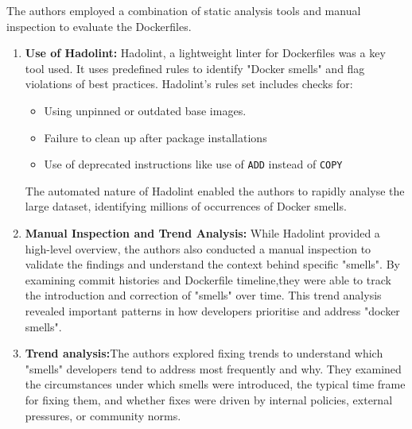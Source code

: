 The authors employed a combination of static analysis tools and manual inspection to evaluate the Dockerfiles.
\begin{enumerate}
    \item \textbf{Use of Hadolint:} Hadolint, a lightweight linter for Dockerfiles was a key tool used. It uses predefined rules to identify "Docker smells" and flag violations of best practices. Hadolint's rules set includes checks for: 
        \begin{itemize}
            \item Using unpinned or outdated base images.
            \item Failure to clean up after package installations
            \item Use of deprecated instructions like use of \verb|ADD| instead of \verb|COPY|
        \end{itemize}
        The automated nature of Hadolint enabled the authors to rapidly analyse the large dataset, identifying millions of occurrences of Docker smells.
    \item \textbf{Manual Inspection and Trend Analysis:} While Hadolint provided a high-level overview, the authors also conducted a manual inspection to validate the findings and understand the context behind specific "smells". By examining commit histories and Dockerfile timeline,they were able to track the introduction and correction of "smells" over time. This trend analysis revealed important patterns in how developers prioritise and address "docker smells".\cite{DockerArtifacts}
    \item \textbf{Trend analysis:}The authors explored fixing trends to understand which "smells" developers tend to address most frequently and why. They examined the circumstances under which smells were introduced, the typical time frame for fixing them, and whether fixes were driven by internal policies, external pressures, or community norms.
\end{enumerate}

